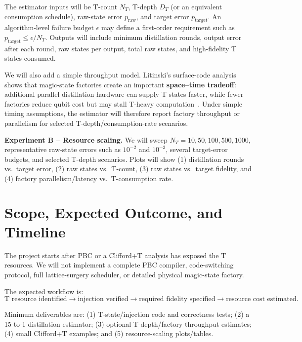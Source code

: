 \documentclass[10pt]{article}
\begin{document}
The estimator inputs will be T-count $N_T$, T-depth $D_T$ (or an equivalent consumption schedule), raw-state error $p_{\mathrm{raw}}$, and target error $p_{\mathrm{target}}$. An algorithm-level failure budget $\epsilon$ may define a first-order requirement such as $p_{\mathrm{target}}\leq\epsilon/N_T$. Outputs will include minimum distillation rounds, output error after each round, raw states per output, total raw states, and high-fidelity T states consumed.

We will also add a simple throughput model. Litinski's surface-code analysis shows that magic-state factories create an important \textbf{space--time tradeoff}: additional parallel distillation hardware can supply T states faster, while fewer factories reduce qubit cost but may stall T-heavy computation~\cite{litinski2019game}. Under simple timing assumptions, the estimator will therefore report factory throughput or parallelism for selected T-depth/consumption-rate scenarios.

\textbf{Experiment B -- Resource scaling.} We will sweep $N_T=10,50,100,500,1000$, representative raw-state errors such as $10^{-2}$ and $10^{-3}$, several target-error budgets, and selected T-depth scenarios. Plots will show (1) distillation rounds vs.\ target error, (2) raw states vs.\ T-count, (3) raw states vs.\ target fidelity, and (4) factory parallelism/latency vs.\ T-consumption rate.

\section{Scope, Expected Outcome, and Timeline}

The project starts after PBC or a Clifford+T analysis has exposed the T resources. We will not implement a complete PBC compiler, code-switching protocol, full lattice-surgery scheduler, or detailed physical magic-state factory.

The expected workflow is:
\[
\text{T resource identified}\rightarrow
\text{injection verified}\rightarrow
\text{required fidelity specified}\rightarrow
\text{resource cost estimated}.
\]

Minimum deliverables are: (1) T-state/injection code and correctness tests; (2) a 15-to-1 distillation estimator; (3) optional T-depth/factory-throughput estimates; (4) small Clifford+T examples; and (5) resource-scaling plots/tables.
\end{document}
